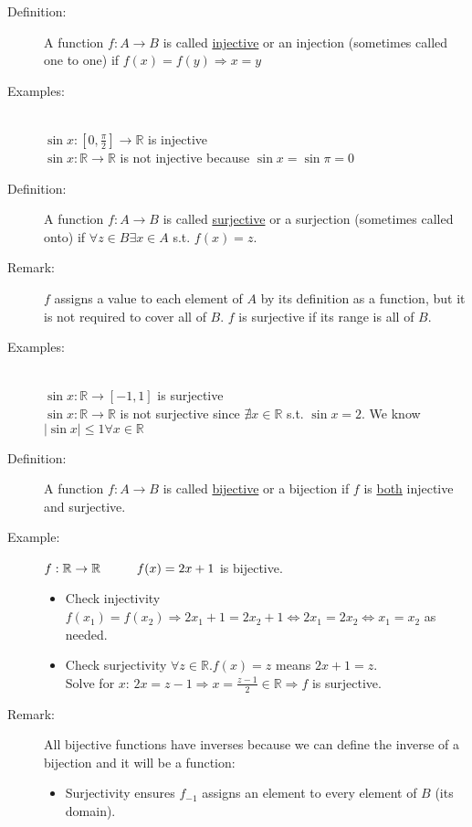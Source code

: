 \documentclass[10pt]{article}
\begin{document}
	\begin{description}
		\item[Definition:] A function $f: A \rightarrow B$ is called \underline{injective} or an injection (sometimes called one to one) if $f(x)=f(y) \Rightarrow x=y$
		\item[Examples:] ~\\
		$\sin{x}: [0, \frac{\pi}{2}] \rightarrow \mathbb{R}$ is injective \\
		$\sin{x}: \mathbb{R} \rightarrow \mathbb{R}$ is not injective because $\sin{x} = \sin{\pi} = 0$
		\item[Definition:] A function $f: A \rightarrow B$ is called \underline{surjective} or a surjection (sometimes called onto) if $\forall z \in B \exists x \in A$ s.t. $f(x) = z$.
		\item[Remark:] $f$ assigns a value to each element of $A$ by its definition as a function, but it is not required to cover all of $B$. $f$ is surjective if its range is all of $B$.
		\item[Examples:] ~\\
		$\sin{x}: \mathbb{R} \rightarrow [-1, 1]$ is surjective \\
		$\sin{x}: \mathbb{R} \rightarrow \mathbb{R}$ is not surjective since $\nexists x \in \mathbb{R}$ s.t. $\sin{x} = 2$. We know $| \sin{x} | \leq 1 \forall x \in \mathbb{R}$
		\item[Definition:] A function $f:A \rightarrow B$ is called \underline{bijective} or a bijection if $f$ is \underline{both} injective and surjective.
		\item[Example:] $f: \mathbb{R} \rightarrow \mathbb{R} \hspace{10mm} f(x) = 2x+1$ is bijective.
		\begin{itemize}
			\item Check injectivity $f(x_1) = f(x_2) \Rightarrow 2x_1 + 1 = 2x_2 + 1 \Leftrightarrow 2x_1 = 2x_2 \Leftrightarrow x_1 = x_2$ as needed.
			\item Check surjectivity $\forall z \in \mathbb{R}. f(x) = z$ means $2x+1=z$. \\
			Solve for $x$: $2x=z-1 \Rightarrow x = \frac{z-1}{2} \in \mathbb{R} \Rightarrow f$ is surjective.
		\end{itemize}
		\item[Remark:] All bijective functions have inverses because we can define the inverse of a bijection and it will be a function:
		\begin{itemize}
			\item Surjectivity ensures $f_{-1}$ assigns an element to every element of $B$ (its domain).

\end{itemize}
\end{description}
\end{document}
